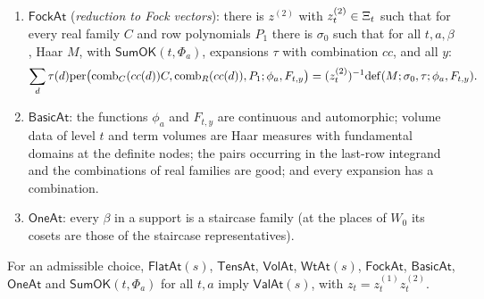 \begin{definition}
\begin{enumerate}[label=(\alph*)]
$w(b)\,\mathrm{sp}(x)=c\prod_w\mathrm{coef}_w(\beta_w)$.
\item $\mathsf{FockAt}$ (\emph{reduction to Fock vectors}): there is $z^{(2)}$ with $z^{(2)}_t\in\Xi_t$ such that for
every real family $C$ and row polynomials $P_1$ there is $\sigma_0$ such that for all $t,a,\beta$, Haar $M$, with
$\mathsf{SumOK}(t,\Phi_a)$, expansions $\tau$ with combination $cc$, and all $y$:
\[
\sum_d\tau(d)\mathrm{per}\bigl(\mathrm{comb}_C(cc(d))C,\mathrm{comb}_R(cc(d)),P_1;\phi_a,F_{t,y}\bigr)
=(z^{(2)}_t)^{-1}\mathrm{def}(M;\sigma_0,\tau;\phi_a,F_{t,y}).
\]
\item $\mathsf{BasicAt}$: the functions $\phi_a$ and $F_{t,y}$ are continuous and automorphic; volume data of level $t$ and term
volumes are Haar measures with fundamental domains at the definite nodes; the pairs occurring in the last-row integrand
and the combinations of real families are good; and every expansion has a combination.
\item $\mathsf{OneAt}$: every $\beta$ in a support is a staircase family (at the places of $W_0$ its cosets are those of the
staircase representatives).
\end{enumerate}
\end{definition}

\begin{proposition}\label{pf:rowprops:valat}
For an admissible choice, $\mathsf{FlatAt}(s)$, $\mathsf{TensAt}$, $\mathsf{VolAt}$, $\mathsf{WtAt}(s)$, $\mathsf{FockAt}$,
$\mathsf{BasicAt}$, $\mathsf{OneAt}$ and $\mathsf{SumOK}(t,\Phi_a)$ for all $t,a$ imply $\mathsf{ValAt}(s)$, with
$z_t=z^{(1)}_tz^{(2)}_t$.
\end{proposition}

